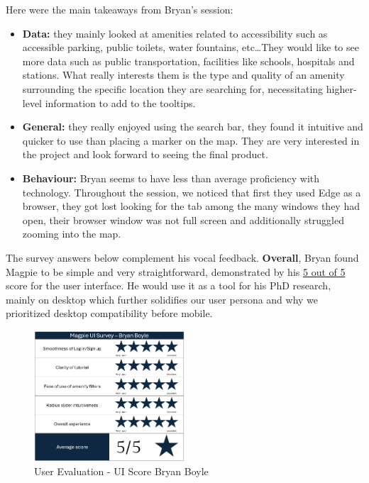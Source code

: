 \newpage Here were the main takeaways from Bryan's session:
\begin{itemize}
    \item \textbf{Data: }they mainly looked at amenities related to
    accessibility such as accessible parking, public toilets, water fountains,
    etc\ldots They would like to see more data such as public transportation,
    facilities like schools, hospitals and stations. What really interests them
    is the type and quality of an amenity surrounding the specific location they
    are searching for, necessitating higher-level information to add to the
    tooltips.\\
    \item \textbf{General: }they really enjoyed using the search bar, they found
    it intuitive and quicker to use than placing a marker on the map. They are
    very interested in the project and look forward to seeing the final
    product.\\
    \item \textbf{Behaviour: } Bryan seems to have less than average proficiency
    with technology. Throughout the session, we noticed that first they used
    Edge as a browser, they got lost looking for the tab among the many windows
    they had open, their browser window was not full screen and additionally
    struggled zooming into the map.
\end{itemize}
The survey answers below complement his vocal feedback. \textbf{Overall}, Bryan
found Magpie to be simple and very straightforward, demonstrated by his
\underline{5 out of 5} score for the user interface. He would use it as a tool
for his PhD research, mainly on desktop which further solidifies our user
persona and why we prioritized desktop compatibility before mobile.
\begin{figure}[h!]
    \centering
    \includegraphics[width=0.5\textwidth]{images/survey-bryan.png}
    \caption{User Evaluation - UI Score Bryan Boyle}
\end{figure}\\

